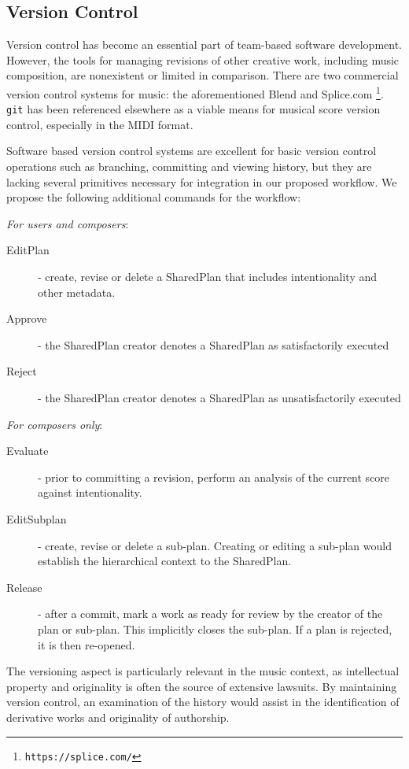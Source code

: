 \documentclass[final,authoryear,5p,times,twocolumn]{elsarticle}
\begin{document}
\subsection{Version Control}

Version control has become an essential part of team-based software development. However, the tools for managing
revisions of other creative work, including music composition, are nonexistent or limited in comparison. There are
two commercial version control systems for music: the aforementioned Blend and Splice.com \footnote{\texttt{https://splice.com/}}. \texttt{git} \citep{torvalds2010git} has been referenced elsewhere \citep{oberholtzer2015computational} as a viable means for musical score version control, especially in the MIDI format.

Software based version control systems are excellent for basic version control operations such as branching, committing and viewing history, but they are lacking several primitives necessary for integration in our proposed workflow. We propose the following additional commands for the workflow:

\noindent \textit{For users and composers}:
\begin{description}
    \item [EditPlan] - create, revise or delete a SharedPlan that includes intentionality and other metadata.
    \item [Approve] - the SharedPlan creator denotes a SharedPlan as satisfactorily executed
    \item [Reject] - the SharedPlan creator denotes a SharedPlan as unsatisfactorily executed
\end{description}

\noindent \textit{For composers only}:
\begin{description}
    \item [Evaluate] - prior to committing a revision, perform an analysis of the current score against intentionality.
    \item [EditSubplan] - create, revise or delete a sub-plan. Creating or editing a sub-plan would establish the hierarchical context to the SharedPlan.
    \item [Release] - after a commit, mark a work as ready for review by the creator of the plan or sub-plan. This implicitly closes the sub-plan. If a plan is rejected, it is then re-opened.
\end{description}

The versioning aspect is particularly relevant in the music context, as intellectual property and originality is often the source of extensive lawsuits. By maintaining version control, an examination of the history would assist in the identification of derivative works and originality of authorship.
\end{document}
